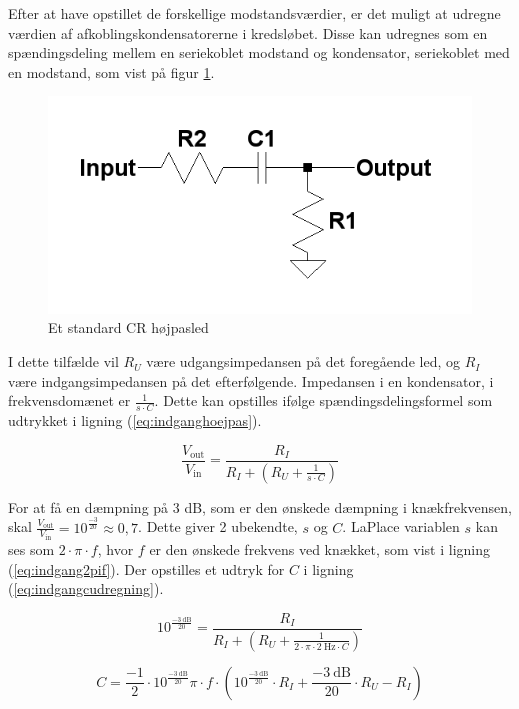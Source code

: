 Efter at have opstillet de forskellige modstandsværdier, er det muligt at udregne værdien af afkoblingskondensatorerne i kredsløbet. Disse kan udregnes som en spændingsdeling mellem en seriekoblet modstand og kondensator, seriekoblet med en modstand, som vist på figur \ref{crvd}.
\begin{figure}[h]
\centering
\includegraphics[scale=0.4]{teknisk/indgangsvaelger/hoejpasfilter.png}
\caption{Et standard CR højpasled}
\label{crvd}
\end{figure}
I dette tilfælde vil $R_U$ være udgangsimpedansen på det foregående led, og $R_I$ være indgangsimpedansen på det efterfølgende. Impedansen i en kondensator, i frekvensdomænet er $\frac{1}{s\cdot C}$. Dette kan opstilles ifølge spændingsdelingsformel som udtrykket i ligning (\ref{eq:indganghoejpas}).

\begin{equation}
\label{eq:indganghoejpas}
\frac{V_{\mathrm{out}}}{V_{\mathrm{in}}}=\frac{R_I}{R_I+\left(R_U+\frac{1}{s\cdot C}\right)}
\end{equation}

For at få en dæmpning på 3 dB, som er den ønskede dæmpning i knækfrekvensen, skal $\frac{V_{\mathrm{out}}}{V_{\mathrm{in}}}=10^{\frac{-3}{20}}\approx0,7$. 
Dette giver 2 ubekendte, $s$ og $C$. LaPlace variablen $s$ kan ses som $2\cdot \pi \cdot f$, hvor $f$ er den ønskede frekvens ved knækket, som vist i ligning (\ref{eq:indgang2pif}). Der opstilles et udtryk for $C$ i ligning (\ref{eq:indgangcudregning}).

\begin{equation}
\label{eq:indgang2pif}
10^{\frac{-3~\mathrm{dB}}{20}}=\frac{R_I}{R_I+\left(R_U+\frac{1}{2\cdot\pi\cdot 2~\mathrm{Hz}\cdot C}\right)}
\end{equation}

\begin{equation}
\label{eq:indgangcudregning}
C=\frac{-1}{2} \cdot 10^{\frac{-3~\mathrm{dB}}{20}} \pi \cdot f \cdot \left( 10^{\frac{-3~\mathrm{dB}}{20}} \cdot R_I + \frac{-3~\mathrm{dB}}{20} \cdot R_U - R_I \right)
\end{equation}

